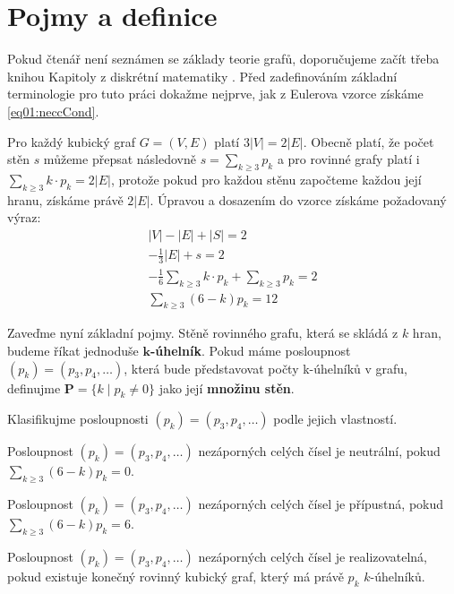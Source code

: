 
\chapter{Pojmy a definice}

Pokud čtenář není seznámen se základy teorie grafů, doporučujeme začít třeba knihou Kapitoly z diskrétní matematiky \cite{Matousek}. Před zadefinováním základní terminologie pro tuto práci dokažme nejprve, jak z Eulerova vzorce získáme \eqref{eq01:neccCond}. 

\begin{dukaz}
Pro každý kubický graf $G = (V,E)$ platí $3 |V| = 2 |E|$. Obecně platí, že počet stěn $s$ můžeme přepsat následovně $s = \sum_{k \geq 3}{p_k}$ a pro rovinné grafy platí i $ \sum_{k \geq 3}{k \cdot p_k}= 2|E|$, protože pokud pro každou stěnu započteme každou její hranu, získáme právě $2|E|$. Úpravou a dosazením do vzorce získáme požadovaný výraz: 
\begin{align*}
|V|-|E|+|S|=2 \\ -\frac{1}{3} |E| + s = 2 \\
-\frac{1}{6} \sum_{k \geq 3}{k \cdot p_k} + \sum_{k \geq 3}{p_k} = 2 \\ 
\sum_{k \geq 3}{(6-k)p_k}=12
\end{align*}
\end{dukaz}

Zaveďme nyní základní pojmy. Stěně rovinného grafu, která se skládá z $k$ hran, budeme říkat jednoduše \textbf{$\boldsymbol{k}$-úhelník}. Pokud máme posloupnost $(p_k) = (p_3,p_4,\dots)$, která bude představovat počty k-úhelníků v grafu, definujme $\boldsymbol{P} = \lbrace k \mid p_k \neq 0 \rbrace$ jako její \textbf{množinu stěn}.

Klasifikujme posloupnosti $(p_k) = (p_3,p_4,\dots)$ podle jejich vlastností.

\begin{definice}\label{def01:neutralni}
Posloupnost $(p_k) = (p_3,p_4,\dots)$ nezáporných celých čísel je neutrální, pokud $\sum_{k \geq 3}{(6-k)p_k}=0$.
\end{definice}

\begin{definice}\label{def01:pripustna}
Posloupnost $(p_k) = (p_3,p_4,\dots)$ nezáporných celých čísel je přípustná, pokud $\sum_{k \geq 3}{(6-k)p_k}=6$.
\end{definice}

\begin{definice}\label{def01:prijatelna}
Posloupnost $(p_k) = (p_3,p_4,\dots)$ nezáporných celých čísel je realizovatelná, pokud existuje konečný rovinný kubický graf, který má právě $p_k$ $k$-úhelníků.
\end{definice}

